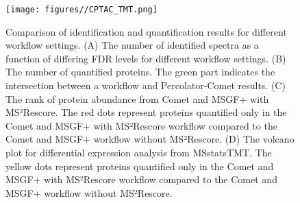\documentclass[12pt]{article}
\begin{document}
\begin{figure}[ht!]
	\centering
	\texttt{[image: figures//CPTAC\_TMT.png]}
	\caption{Comparison of identification and quantification results for different workflow settings. (A) The number of identified spectra as a function of differing FDR levels for different workflow settings. (B) The number of quantified proteins. The green part indicates the intersection between a workflow and Percolator-Comet results. (C) The rank of protein abundance from Comet and MSGF+ with MS²Rescore. The red dots represent proteins quantified only in the Comet and MSGF+ with MS²Rescore workflow compared to the Comet and MSGF+ workflow without MS²Rescore. (D) The volcano plot for differential expression analysis from MSstatsTMT. The yellow dots represent proteins quantified only in the Comet and MSGF+ with MS²Rescore workflow compared to the Comet and MSGF+ workflow without MS²Rescore.} %
	\label{fig:PDC_ms2rescore}
\end{figure}



\end{document}

